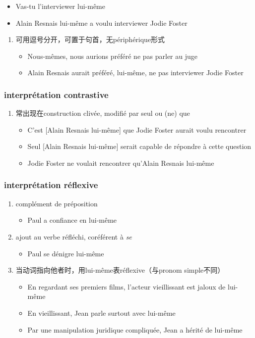 \documentclass[UTF8]{report}
\begin{document}
\begin{enumerate}
\begin{itemize}
        \item Vas-tu l’interviewer lui-même
        \item Alain Resnais lui-même a voulu interviewer Jodie Foster
    \end{itemize}
    \begin{enumerate}
        \item 可用逗号分开，可置于句首，无périphérique形式
        \begin{itemize}
            \item Nous-mêmes, nous aurions préféré ne pas parler au juge
            \item Alain Resnais aurait préféré, lui-même, ne pas interviewer Jodie Foster
        \end{itemize}
    \end{enumerate}
\end{enumerate}
\subsubsection{interprétation contrastive}
\begin{enumerate}
    \item 常出现在construction clivée, modifié par seul ou (ne) que
    \begin{itemize}
        \item C’est [Alain Resnais lui-même] que Jodie Foster aurait voulu rencontrer
        \item Seul [Alain Resnais lui-même] serait capable de répondre à cette question
        \item Jodie Foster ne voulait rencontrer qu’Alain Resnais lui-même
    \end{itemize}
\end{enumerate}
\subsubsection{interprétation réflexive}
\begin{enumerate}
    \item complément de préposition
    \begin{itemize}
        \item Paul a confiance en lui-même
    \end{itemize}
    \item ajout au verbe réfléchi, coréférent à \textit{se}
    \begin{itemize}
        \item Paul se dénigre lui-même
    \end{itemize}
    \item 当动词指向他者时，用lui-même表réflexive（与pronom simple不同）
    \begin{itemize}
        \item En regardant ses premiers films, l’acteur vieillissant est jaloux de lui-même 
        \item En vieillissant, Jean parle surtout avec lui-même
        \item Par une manipulation juridique compliquée, Jean a hérité de lui-même
    \end{itemize}
\end{enumerate}
\end{document}
